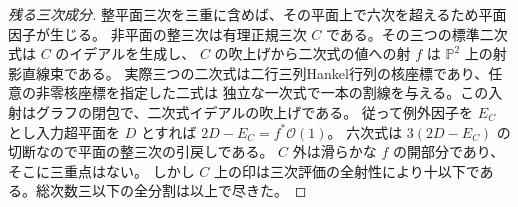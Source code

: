 \begin{proof}[残る三次成分]
整平面三次を三重に含めば、その平面上で六次を超えるため平面因子が生じる。
非平面の整三次は有理正規三次 $C$ である。その三つの標準二次式は $C$ のイデアルを生成し、
$C$ の吹上げから二次式の値への射 $f$ は $\mathbb P^2$ 上の射影直線束である。
実際三つの二次式は二行三列Hankel行列の核座標であり、任意の非零核座標を指定した二式は
独立な一次式で一本の割線を与える。この入射はグラフの閉包で、二次式イデアルの吹上げである。
従って例外因子を $E_C$ とし入力超平面を $D$ とすれば $2D-E_C=f^*\mathcal O(1)$。
六次式は $3(2D-E_C)$ の切断なので平面の整三次の引戻しである。
$C$ 外は滑らかな $f$ の開部分であり、そこに三重点はない。
しかし $C$ 上の印は三次評価の全射性により十以下である。総次数三以下の全分割は以上で尽きた。
\end{proof}
